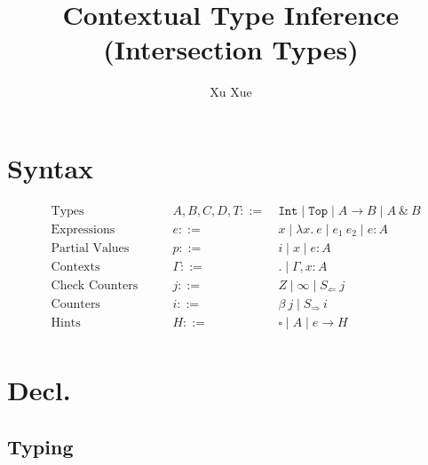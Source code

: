 \documentclass{article}
\title{Contextual Type Inference (Intersection Types)}
\author{Xu Xue}
\begin{document}
\maketitle

\section{Syntax}

\begin{align*}
&\text{Types} \quad\quad &A, B, C, D, T ::=&~ \mathtt{Int} \mid \mathtt{Top} \mid A \rightarrow B \mid A~\&~B\\
&\text{Expressions} \quad \quad &e::=&~ x \mid \lambda x . ~e \mid e_1~e_2 \mid e : A\\
&\text{Partial Values} \quad \quad &p::=&~ i \mid x \mid e : A\\
&\text{Contexts} \quad\quad &\Gamma::=&~ . \mid \Gamma, x : A\\
&\text{Check Counters} \quad\quad &j ::=&~ Z \mid \infty \mid S_{\Leftarrow}~j \\
&\text{Counters} \quad\quad &i ::= &~ \beta ~j \mid S_{\Rightarrow}~i\\
&\text{Hints} \quad\quad &H ::=&~ \square \mid A \mid \boxed{e} \rightarrow H\\
\end{align*}

\section{Decl.}

\subsection{Typing}
\end{document}
